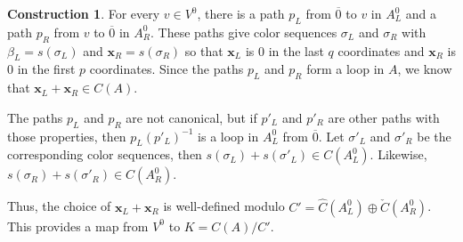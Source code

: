 \documentclass[12pt,twoside,singlespace]{article}
\numberwithin{equation}{section}
\theoremstyle{definition}
\newtheorem{construction}[equation]{Construction}
\renewcommand{\vec}[1]{\mathbf{#1}}
\begin{document}
\begin{construction}
\label{cons:findk}
For every $v\in V^0$, there is a path $p_L$ from $\overline{0}$ to $v$ in $A_L^0$ and a path $p_R$ from $v$ to $\overline{0}$ in $A_R^0$.  These paths give color sequences $\sigma_L$ and $\sigma_R$ with $\beta_L=s(\sigma_L)$ and $\vec{x}_R=s(\sigma_R)$ so that $\vec{x}_L$ is $0$ in the last $q$ coordinates and $\vec{x}_R$ is $0$ in the first $p$ coordinates.  Since the paths $p_L$ and $p_R$ form a loop in $A$, we know that $\vec{x}_L+\vec{x}_R\in C(A)$.

The paths $p_L$ and $p_R$ are not canonical, but if $p'_L$ and $p'_R$ are other paths with those properties, then $p_L(p'_L)^{-1}$ is a loop in $A_L^0$ from $\overline{0}$.  Let $\sigma'_L$ and $\sigma'_R$ be the corresponding color sequences, then $s(\sigma_L)+s(\sigma'_L)\in C(A_L^0)$.  Likewise, $s(\sigma_R)+s(\sigma'_R)\in C(A_R^0)$.

Thus, the choice of $\vec{x}_L+\vec{x}_R$ is well-defined modulo $C'=\hat{C}(A_L^0)\oplus \check{C}(A_R^0)$.  This provides a map from $V^0$ to $K=C(A)/C'$.
\end{construction}
\end{document}
